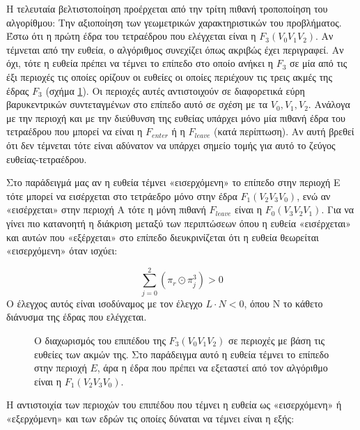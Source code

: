 Η τελευταία βελτιστοποίηση προέρχεται από την τρίτη πιθανή τροποποίηση του αλγορίθμου: Την αξιοποίηση των γεωμετρικών χαρακτηριστικών του προβλήματος. Έστω ότι η πρώτη έδρα του τετραέδρου που ελέγχεται είναι η $F_3(V_0V_1V_2)$. Αν τέμνεται από την ευθεία, ο αλγόριθμος συνεχίζει όπως  ακριβώς έχει περιγραφεί. Αν όχι, τότε η ευθεία πρέπει να τέμνει το επίπεδο στο οποίο ανήκει η $F_3$ σε μία από τις έξι περιοχές τις οποίες ορίζουν οι ευθείες οι οποίες περιέχουν τις τρεις ακμές της έδρας $F_3$ (σχήμα \ref{fig5}). Οι περιοχές αυτές αντιστοιχούν σε διαφορετικά εύρη βαρυκεντρικών συντεταγμένων στο επίπεδο αυτό σε σχέση με τα $V_0,V_1,V_2$. Ανάλογα με την περιοχή και με την διεύθυνση της ευθείας υπάρχει μόνο μία πιθανή έδρα του τετραέδρου που μπορεί να είναι η $F_{enter}$ ή η $F_{leave}$ (κατά περίπτωση).
Αν αυτή βρεθεί ότι δεν τέμνεται τότε είναι αδύνατον να υπάρχει σημείο τομής για αυτό το ζεύγος ευθείας-τετραέδρου.

Στο παράδειγμά μας αν η ευθεία τέμνει «εισερχόμενη» το επίπεδο στην περιοχή E τότε μπορεί να εισέρχεται στο τετράεδρο μόνο στην έδρα $F_1(V_2V_3V_0)$, ενώ αν «εισέρχεται» στην περιοχή Α τότε η μόνη πιθανή $F_{leave}$ είναι η $F_0(V_3V_2V_1)$. Για να γίνει πιο κατανοητή η διάκριση μεταξύ των περιπτώσεων όπου η ευθεία «εισέρχεται» και αυτών που «εξέρχεται» στο επίπεδο διευκρινίζεται ότι η ευθεία θεωρείται «εισερχόμενη» όταν ισχύει:

\begin{equation*}
\displaystyle\sum_{j=0}^{2}(\pi_r \odot \pi^3_j) > 0
\end{equation*}
Ο έλεγχος αυτός είναι ισοδύναμος με τον έλεγχο $L \cdot N < 0$, όπου Ν το κάθετο διάνυσμα της έδρας που ελέγχεται.

\begin{figure}[h!]
\caption{Ο διαχωρισμός του επιπέδου της $F_3(V_0V_1V_2)$ σε περιοχές με βάση τις ευθείες των ακμών της. Στο παράδειγμα αυτό η ευθεία τέμνει το επίπεδο στην περιοχή $E$, άρα η έδρα που πρέπει να εξεταστεί από τον αλγόριθμο είναι η $F_1(V_2V_3V_0)$.}
\label{fig5}
\end{figure}
Η αντιστοιχία των περιοχών του επιπέδου που τέμνει η ευθεία ως «εισερχόμενη» ή «εξερχόμενη» και των εδρών τις οποίες δύναται να τέμνει είναι η εξής:

